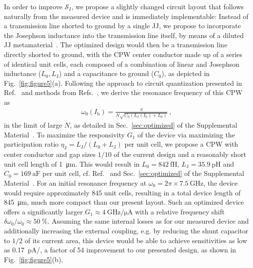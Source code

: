 In order to improve $\mathcal{S}_I$, we propose a slightly changed circuit layout that follows naturally from the measured device and is immediately implementable:
% 
Instead of a transmission line shorted to ground by a single JJ, we propose to incorporate the Josephson inductance into the transmission line itself, by means of a diluted JJ metamaterial~\cite{planatUnderstandingSaturationPower2019}.
% 
The optimized design would then be a transmission line directly shorted to ground, with the CPW center conductor made up of a series of identical unit cells, each composed of a combination of linear and Josephson inductance ($L_0,L_\text{J}$) and a capacitance to ground ($C_0$), as depicted in Fig.~\ref{fig:figure5}(a).
% 
Following the approach to circuit quantization presented in Ref.~\cite{gelyQuCATQuantumCircuit2019} and methods from Refs.~\cite{noscheseTridiagonalToeplitzMatrices2013,niggBlackBoxSuperconductingCircuit2012,vool_introductionquantum_2017}, we derive the resonance frequency of this CPW as
% 
\begin{align}
\omega_0(I_\text{b})=\frac{\pi}{N\sqrt{C_0(L_\text{J}(I_\text{b})+L_0)}} \ ,
\end{align}
% 
in the limit of large $N$, as detailed in Sec.~\ref{sec:optimized} of the Supplemental Material~\cite{SeeSupplementalMaterial}.
% 
To maximize the responsivity $G_1$ of the device via maximizing the participation ratio $\eta_\text{J}=L_\text{J}/(L_0+L_\text{J})$ per unit cell, we propose a CPW with center conductor and gap sizes $1/10$ of the current design and a reasonably short unit cell length of \SI{1}{\micro\meter}.
% 
This would result in $L_0=\SI{842}{\femto\henry}$, $L_\text{J}=\SI{35.9}{\pico\henry}$ and $C_0=\SI{169}{\atto\farad}$ per unit cell, cf. Ref.~\cite{simonsCoplanarWaveguideCircuits2001} and Sec.~\ref{sec:optimized} of the Supplemental Material~\cite{SeeSupplementalMaterial}.
% 
For an initial resonance frequency at $\omega_0=2\pi\times\SI{7.5}{\giga\hertz}$, the device would require approximately 845 unit cells, resulting in a total device length of \SI{845}{\micro\meter}, much more compact than our present layout.
% 
Such an optimized device offers a significantly larger $G_1\approx\SI{4}{\giga\hertz\per\micro\ampere}$ with a relative frequency shift $\delta\omega_0/\omega_0\approx\SI{50}{\percent}$.
% 
Assuming the same internal losses as for our measured device and additionally increasing the external coupling, e.g. by reducing the shunt capacitor to $1/2$ of its current area, this device would be able to achieve sensitivities as low as \SI{0.17}{\pico\ampere/\sqrthz}, a factor of 54 improvement to our presented design, as shown in Fig.~\ref{fig:figure5}(b).


